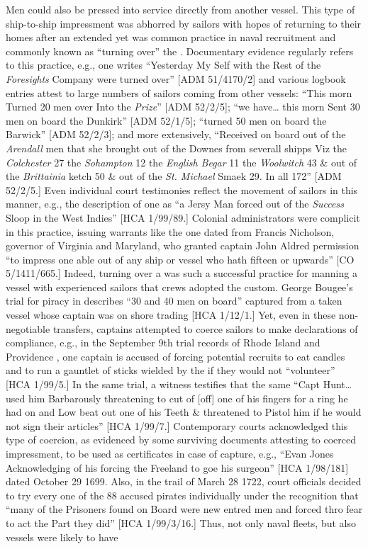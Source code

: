 Men could also be pressed into service directly from another vessel. This type of ship-to-ship impressment was abhorred by  sailors with hopes of returning to their homes after an extended  yet was common practice in naval recruitment and commonly known as “turning over” the . Documentary evidence regularly refers to this practice, e.g., one  writes “Yesterday My Self with the Rest of the \textit{Foresights} Company were turned over” [ADM 51/4170/2] and various logbook entries attest to large numbers of sailors coming from other vessels: “This morn Turned 20 men over Into the \textit{ Prize}” [ADM 52/2/5]; “we have… this morn Sent 30 men on board the Dunkirk” [ADM 52/1/5]; “turned 50 men on board the Barwick” [ADM 52/2/3]; and more extensively, “Received on board out of the \textit{Arendall} men that she brought out of the Downes from severall shipps Viz the \textit{Colchester} 27 the \textit{Sohampton} 12 the \textit{English Begar} 11 the \textit{Woolwitch} 43 \& out of the \textit{Brittainia} ketch 50 \& out of the \textit{St. Michael} Smaek 29. In all 172” [ADM 52/2/5.] Even individual court testimonies reflect the movement of sailors in this manner, e.g., the description of one  as “a Jersy Man forced out of the \textit{Success} Sloop in the West Indies” [HCA 1/99/89.] Colonial administrators were complicit in this practice, issuing warrants like the one dated \citealt{January1699} from Francis Nicholson, governor of Virginia and Maryland, who granted captain John Aldred permission “to impress one able  out of any ship or vessel who hath fifteen  or upwards” [CO 5/1411/665.] Indeed, turning over a  was such a successful practice for manning a vessel with experienced sailors that  crews adopted the custom. George Bougee’s trial for piracy in \citealt{October1684} describes “30 and 40 men on board” captured from a taken vessel whose captain was on shore trading [HCA 1/12/1.] Yet, even in these non-negotiable transfers, captains attempted to coerce sailors to make declarations of compliance, e.g., in the September 9th trial records of Rhode Island and Providence \citealt{Plantation1725}, one  captain is accused of forcing potential recruits to eat candles and to run a gauntlet of sticks wielded by the  if they would not “volunteer” [HCA 1/99/5.] In the same trial, a witness testifies that the same “Capt Hunt… used him Barbarously threatening to cut of [off] one of his fingers for a ring he had on and Low beat out one of his Teeth \& threatened to Pistol him if he would not sign their articles” [HCA 1/99/7.] Contemporary courts acknowledged this type of coercion, as evidenced by some surviving documents attesting to coerced impressment, to be used as certificates in case of capture, e.g., “Evan Jones Acknowledging of his forcing the Freeland to goe his surgeon” [HCA 1/98/181] dated October 29 1699. Also, in the trail of March 28 1722, court officials decided to try every one of the 88 accused pirates individually under the recognition that “many of the Prisoners found on Board were new entred men and forced thro fear to act the Part they did” [HCA 1/99/3/16.] Thus, not only naval fleets, but also  vessels were likely to have 